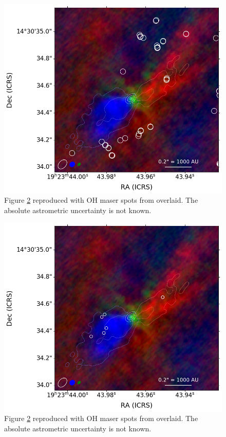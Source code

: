 \documentclass[twocolumn]{aastex62}
\begin{document}
\begin{figure}[htp]
    \includegraphics[width=\textwidth]{figures/W51e2e_sio_outflow_with_CS_contours_and_oh.png}
    \caption{Figure \ref{fig:overlay} reproduced with OH maser spots from \citet{Fish2007a}
    overlaid.  The absolute astrometric uncertainty is not known.
    }
    \label{fig:overlay}
\end{figure}

\begin{figure}[htp]
    \includegraphics[width=\textwidth]{figures/W51e2e_sio_outflow_with_CS_contours_and_h2o.png}
    \caption{Figure \ref{fig:overlay} reproduced with OH maser spots from \citet{Sato2010a}
    overlaid.  The absolute astrometric uncertainty is not known.
    }
    \label{fig:overlay}
\end{figure}



\end{document}
